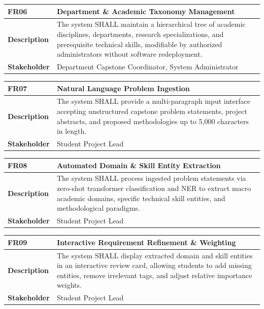 \begin{table}[H]
\centering
\small
\begin{tabularx}{\textwidth}{|l|X|}
\hline
\rowcolor{lightgray!40} \textbf{FR06} & \textbf{Department \& Academic Taxonomy Management} \\ \hline
\textbf{Description} & The system SHALL maintain a hierarchical tree of academic disciplines, departments, research specializations, and prerequisite technical skills, modifiable by authorized administrators without software redeployment. \\ \hline
\textbf{Stakeholder} & Department Capstone Coordinator, System Administrator \\ \hline
\end{tabularx}
\end{table}

\begin{table}[H]
\centering
\small
\begin{tabularx}{\textwidth}{|l|X|}
\hline
\rowcolor{lightgray!40} \textbf{FR07} & \textbf{Natural Language Problem Ingestion} \\ \hline
\textbf{Description} & The system SHALL provide a multi-paragraph input interface accepting unstructured capstone problem statements, project abstracts, and proposed methodologies up to 5,000 characters in length. \\ \hline
\textbf{Stakeholder} & Student Project Lead \\ \hline
\end{tabularx}
\end{table}

\begin{table}[H]
\centering
\small
\begin{tabularx}{\textwidth}{|l|X|}
\hline
\rowcolor{lightgray!40} \textbf{FR08} & \textbf{Automated Domain \& Skill Entity Extraction} \\ \hline
\textbf{Description} & The system SHALL process ingested problem statements via zero-shot transformer classification and NER to extract macro academic domains, specific technical skill entities, and methodological paradigms. \\ \hline
\textbf{Stakeholder} & Student Project Lead \\ \hline
\end{tabularx}
\end{table}

\begin{table}[H]
\centering
\small
\begin{tabularx}{\textwidth}{|l|X|}
\hline
\rowcolor{lightgray!40} \textbf{FR09} & \textbf{Interactive Requirement Refinement \& Weighting} \\ \hline
\textbf{Description} & The system SHALL display extracted domain and skill entities in an interactive review card, allowing students to add missing entities, remove irrelevant tags, and adjust relative importance weights. \\ \hline
\textbf{Stakeholder} & Student Project Lead \\ \hline
\end{tabularx}
\end{table}

